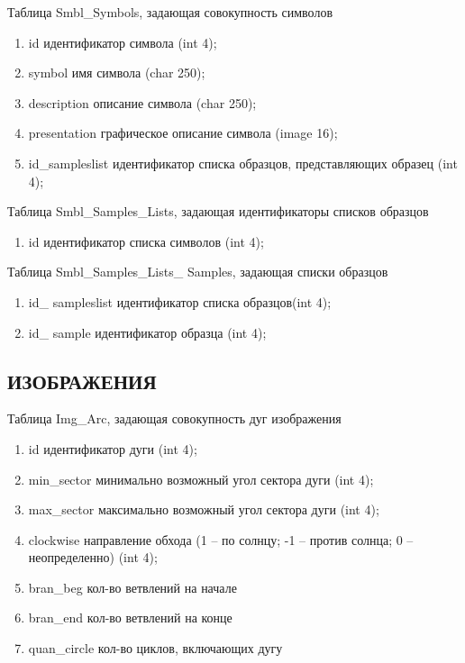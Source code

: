 \noindent 
Таблица Smbl\_Symbols, задающая совокупность символов
\small
\begin{enumerate}
\item id			идентификатор символа (int 4);
\item symbol                   	имя символа  (char    250);
\item description            	описание символа (char   250);
\item presentation          	графическое описание символа (image   16);
\item id\_sampleslist 	идентификатор списка образцов, представляющих образец (int 4);
\end{enumerate}
\normalsize


\noindent 
Таблица Smbl\_Samples\_Lists, задающая идентификаторы списков образцов
\small
\begin{enumerate}
\item id			идентификатор списка символов (int 4);
\end{enumerate}
\normalsize


\noindent 
Таблица Smbl\_Samples\_Lists\_ Samples, задающая списки образцов
\small
\begin{enumerate}
\item id\_ sampleslist      	идентификатор списка образцов(int 4);
\item id\_ sample      	идентификатор образца (int 4);
\end{enumerate}

\normalsize 

\noindent 
\subsection*{ИЗОБРАЖЕНИЯ}
\noindent 
Таблица Img\_Arc, задающая совокупность дуг изображения
\small
\begin{enumerate}
\item id			идентификатор дуги (int 4);
\item min\_sector           	минимально возможный угол сектора дуги (int 4);
\item max\_sector          	максимально возможный угол сектора дуги (int 4);
\item clockwise            	направление обхода (1 – по солнцу; -1 – против солнца; 0 – неопределенно) (int 4);
\item bran\_beg            	кол-во ветвлений на начале
\item bran\_end            	кол-во ветвлений на конце
\item quan\_circle        	кол-во циклов, включающих дугу
\end{enumerate}
\normalsize


